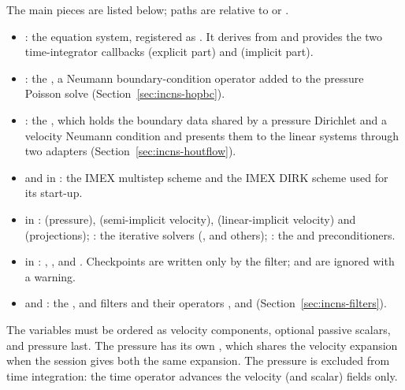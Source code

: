The main pieces are listed below; paths are relative to
 or .

\begin{itemize}
  \item {}: the
  equation system, registered as . It derives
  from  and provides the two time-integrator
  callbacks  (explicit part) and
   (implicit part).
  \item {}: the
  , a Neumann boundary-condition operator added to
  the pressure Poisson solve (Section~\ref{sec:incns-hopbc}).
  \item {}: the
  , which holds the boundary data shared by a pressure
  Dirichlet and a velocity Neumann condition and presents them to the linear
  systems through two adapters (Section~\ref{sec:incns-houtflow}).
  \item {} and  in :
  the IMEX multistep scheme and the IMEX DIRK scheme used for its start-up.
  \item {} in :
   (pressure),  (semi-implicit
  velocity),  (linear-implicit velocity) and
   (projections); : the
  iterative solvers (,  and others);
  : the  and  preconditioners.
  \item {} in : ,
  ,  and . Checkpoints
  are written only by the  filter; 
  and  are ignored with a warning.
  \item {} and : the ,
   and  filters and their operators
  ,  and 
  (Section~\ref{sec:incns-filters}).
\end{itemize}

The variables must be ordered as velocity components, optional passive
scalars, and pressure last. The pressure has its own , which
shares the velocity expansion when the session gives both the same
expansion. The pressure is excluded from time integration: the time operator
advances the velocity (and scalar) fields only.

